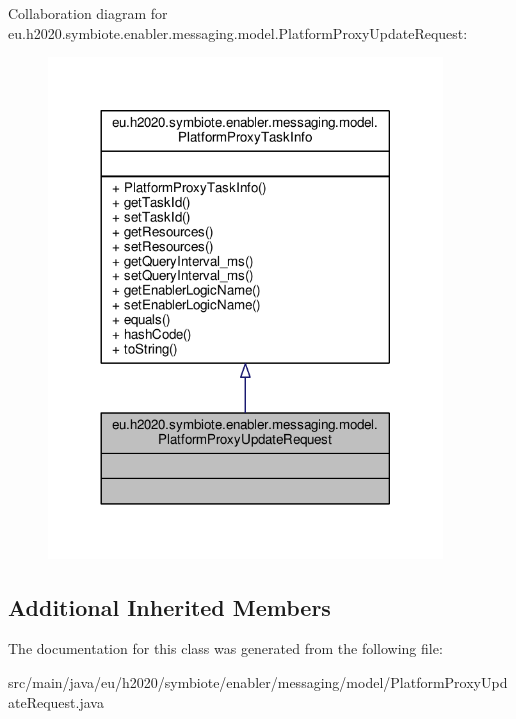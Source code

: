 Collaboration diagram for eu.\+h2020.\+symbiote.\+enabler.\+messaging.\+model.\+Platform\+Proxy\+Update\+Request\+:\nopagebreak
\begin{figure}[H]
\begin{center}
\leavevmode
\includegraphics[width=296pt]{classeu_1_1h2020_1_1symbiote_1_1enabler_1_1messaging_1_1model_1_1PlatformProxyUpdateRequest__coll__graph}
\end{center}
\end{figure}
\subsection*{Additional Inherited Members}


The documentation for this class was generated from the following file\+:\begin{DoxyCompactItemize}
\item 
src/main/java/eu/h2020/symbiote/enabler/messaging/model/Platform\+Proxy\+Update\+Request.\+java\end{DoxyCompactItemize}
